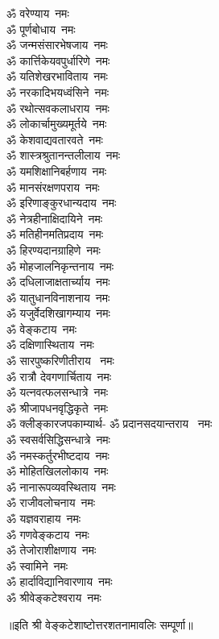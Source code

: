 \begin{multicols}{2}
\begin{flushleft}
        ॐ वरेण्याय~नमः\\
        ॐ पूर्णबोधाय~नमः\\
        ॐ जन्मसंसारभेषजाय~नमः\\
        ॐ कार्त्तिकेयवपुर्धारिणे~नमः\\
        ॐ यतिशेखरभाविताय~नमः\\
        ॐ नरकादिभयध्वंसिने~नमः\\
        ॐ रथोत्सवकलाधराय~नमः\\
        ॐ लोकार्चामुख्यमूर्तये~नमः\\
        ॐ केशवाद्यवतारवते~नमः\hfill{}\\
                                                        
        ॐ शास्त्रश्रुतानन्तलीलाय~नमः\\
        ॐ यमशिक्षानिबर्हणाय~नमः\\
        ॐ मानसंरक्षणपराय~नमः\\
        ॐ इरिणाङ्कुरधान्यदाय~नमः\\
        ॐ नेत्रहीनाक्षिदायिने~नमः\\
        ॐ मतिहीनमतिप्रदाय~नमः\\
        ॐ हिरण्यदानग्राहिणे~नमः\\
        ॐ मोहजालनिकृन्तनाय~नमः\\
        ॐ दधिलाजाक्षतार्च्याय~नमः\\
        ॐ यातुधानविनाशनाय~नमः\hfill{}\\
                                                        
        ॐ यजुर्वेदशिखागम्याय~नमः\\
        ॐ वेङ्कटाय~नमः\\
        ॐ दक्षिणास्थिताय~नमः\\
        ॐ सारपुष्करिणीतीराय ~नमः\\
        ॐ रात्रौ  देवगणार्चिताय~नमः\\
        ॐ यत्नवत्फलसन्धात्रे~नमः\\
        ॐ श्रीजापधनवृद्धिकृते~नमः\\
        ॐ क्लीङ्कारजपकाम्यार्थ-
        ॐ प्रदानसदयान्तराय ~नमः\\
        ॐ स्वसर्वसिद्धिसन्धात्रे~नमः\\
        ॐ नमस्कर्तुरभीष्टदाय~नमः\hfill{}\\
        
        ॐ मोहितखिललोकाय~नमः\\
        ॐ नानारूपव्यवस्थिताय~नमः\\
        ॐ राजीवलोचनाय~नमः\\
        ॐ यज्ञवराहाय~नमः\\
        ॐ गणवेङ्कटाय~नमः\\
        ॐ तेजोराशीक्षणाय~नमः\\
        ॐ स्वामिने~नमः\\
        ॐ हार्दाविद्यानिवारणाय~नमः\hfill{}\\
        ॐ श्रीवेङ्कटेश्वराय~नमः\\
    \end{flushleft}
\end{multicols}
॥इति श्री वेङ्कटेशाष्टोत्तरशतनामावलिः सम्पूर्णा॥
